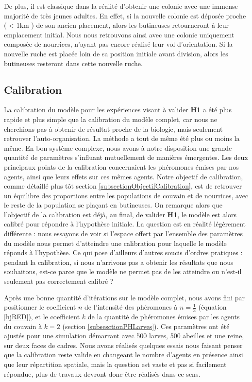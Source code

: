 			De plus, il est classique dans la réalité d'obtenir une colonie avec une immense majorité de très jeunes adultes. En effet, si la nouvelle colonie est déposée proche ( < 1km ) de son ancien placement, alors les butineuses retourneront à leur emplacement initial. Nous nous retrouvons ainsi avec une colonie uniquement composée de nourrices, n'ayant pas encore réalisé leur vol d'orientation. Si la nouvelle ruche est placée loin de sa position initiale avant division, alors les butineuses resteront dans cette nouvelle ruche.
				

		\subsection{Calibration}
		La calibration du modèle pour les expériences visant à valider \textbf{H1} a été plus rapide et plus simple que la calibration du modèle complet, car nous ne cherchions pas à obtenir de résultat proche de la biologie, mais seulement retrouver l'auto-organisation. La méthode a tout de même été plus ou moins la même. En bon système complexe, nous avons à notre disposition une grande quantité de paramètres s'influant mutuellement de manières émergentes. Les deux principaux points de la calibration concernaient les phéromones émises par nos agents, ainsi que leurs effets sur ces mêmes agents. Notre objectif de calibration, comme détaillé plus tôt section \ref{subsectionObjectifCalibration}, est de retrouver un équilibre des proportions entre les populations de couvain et de nourrices, avec le reste de la population se plaçant en butineuses. On remarque alors que l'objectif de la calibration est déjà, au final, de valider \textbf{H1}, le modèle est alors calibré pour répondre à l'hypothèse initiale. La question est en réalité légèrement différente : nous essayons de voir si l'espace offert par l'ensemble des paramètres du modèle nous permet d'atteindre une calibration pour laquelle le modèle réponds à l'hypothèse. Ce qui pose d'ailleurs d'autres soucis d'ordres pratiques : pendant la calibration, si nous n'arrivons pas a obtenir les résultats que nous souhaitons, est-ce parce que le modèle ne permet pas de les atteindre ou n'est-il seulement pas correctement calibré ?
		
		Après une bonne quantité d'itérations sur le modèle complet, nous avons fini par positionner le coefficient $n$ de l'intensité des phéromones à $n = \frac{1}{3}$ (équation \ref{hjRED}), et le coefficient $k$ de la quantité de phéromones émises par les agents du couvain à $k=2$ (section \ref{subsesctionPHLarves}). Ces paramètres ont été ajustés pour une simulation démarrant avec 500 larves, 500 abeilles et une reine, sur deux faces de cadres. Nous avons réalisés quelques essais nous faisant penser que la calibration reste valide en changeant le nombre d'agents en présence ainsi que leur répartition spatiale, mais la question est vaste et pas si facilement répondue, plus de travaux devront donc être réalisés dans ce sens.
		
